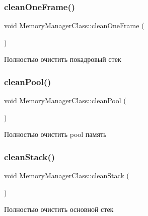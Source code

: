 \subsubsection{\texorpdfstring{clean\+One\+Frame()}{cleanOneFrame()}}
{\footnotesize\ttfamily void Memory\+Manager\+Class\+::clean\+One\+Frame (\begin{DoxyParamCaption}{ }\end{DoxyParamCaption})}



Полностью очистить покадровый стек 

\mbox{\label{class_memory_manager_class_a133fe89cf9f7d72d1fbe15f35ed5c4c7}} 
\subsubsection{\texorpdfstring{clean\+Pool()}{cleanPool()}}
{\footnotesize\ttfamily void Memory\+Manager\+Class\+::clean\+Pool (\begin{DoxyParamCaption}{ }\end{DoxyParamCaption})}



Полностью очистить pool память 

\mbox{\label{class_memory_manager_class_a3d568e53b61a6ae0d86060f4043d666d}} 
\subsubsection{\texorpdfstring{clean\+Stack()}{cleanStack()}}
{\footnotesize\ttfamily void Memory\+Manager\+Class\+::clean\+Stack (\begin{DoxyParamCaption}{ }\end{DoxyParamCaption})}



Полностью очистить основной стек 

\mbox{\label{class_memory_manager_class_a2aca67cf7c270e92a0aba0eaa0039996}} 
